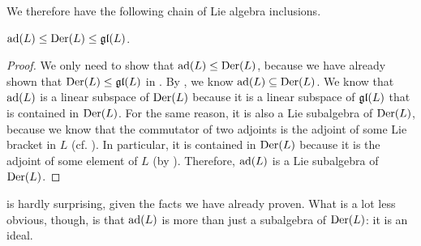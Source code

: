 We therefore have the following chain of Lie algebra inclusions.

\begin{boxlemma}\label{Ch1:Lemma:adSubalgDer}
    $\pad{L} \leq \Der{L} \leq \gl{L}$.
\end{boxlemma}
\begin{proof}
    We only need to show that $\pad{L} \leq \Der{L}$, because we have already shown that $\Der{L} \leq \gl{L}$ in . By , we know $\pad{L} \subseteq \Der{L}$. We know that $\pad{L}$ is a linear subspace of $\Der{L}$ because it is a linear subspace of $\gl{L}$ that is contained in $\Der{L}$. For the same reason, it is also a Lie subalgebra of $\Der{L}$, because we know that the commutator of two adjoints is the adjoint of some Lie bracket in $L$ (cf. ). In particular, it is contained in $\Der{L}$ because it is the adjoint of some element of $L$ (by ). Therefore, $\pad{L}$ is a Lie subalgebra of $\Der{L}$.
\end{proof}

 is hardly surprising, given the facts we have already proven. What is a lot less obvious, though, is that $\pad{L}$ is more than just a subalgebra of $\Der{L}$: it is an ideal.

